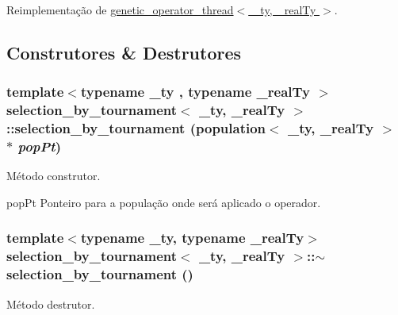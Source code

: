 Reimplementação de \hyperlink{classgenetic__operator__thread_abe926f8fc2a1548516dad216a1acd4fb}{genetic\_\-operator\_\-thread$<$ \_\-ty, \_\-realTy $>$}.



\subsection{Construtores \& Destrutores}
\hypertarget{classselection__by__tournament_a511f69a870e3bb1fdcf7aa8d48383c15}{
\subsubsection[{selection\_\-by\_\-tournament}]{\setlength{\rightskip}{0pt plus 5cm}template$<$typename \_\-ty , typename \_\-realTy $>$ {\bf selection\_\-by\_\-tournament}$<$ \_\-ty, \_\-realTy $>$::{\bf selection\_\-by\_\-tournament} ({\bf population}$<$ \_\-ty, \_\-realTy $>$ $\ast$ {\em popPt})}}
\label{classselection__by__tournament_a511f69a870e3bb1fdcf7aa8d48383c15}
Método construtor.

popPt Ponteiro para a população onde será aplicado o operador. \hypertarget{classselection__by__tournament_a4865e086f5a9f3aeb6991814f13f7eda}{
\subsubsection[{$\sim$selection\_\-by\_\-tournament}]{\setlength{\rightskip}{0pt plus 5cm}template$<$typename \_\-ty, typename \_\-realTy$>$ {\bf selection\_\-by\_\-tournament}$<$ \_\-ty, \_\-realTy $>$::$\sim${\bf selection\_\-by\_\-tournament} ()}}
\label{classselection__by__tournament_a4865e086f5a9f3aeb6991814f13f7eda}
Método destrutor. 

